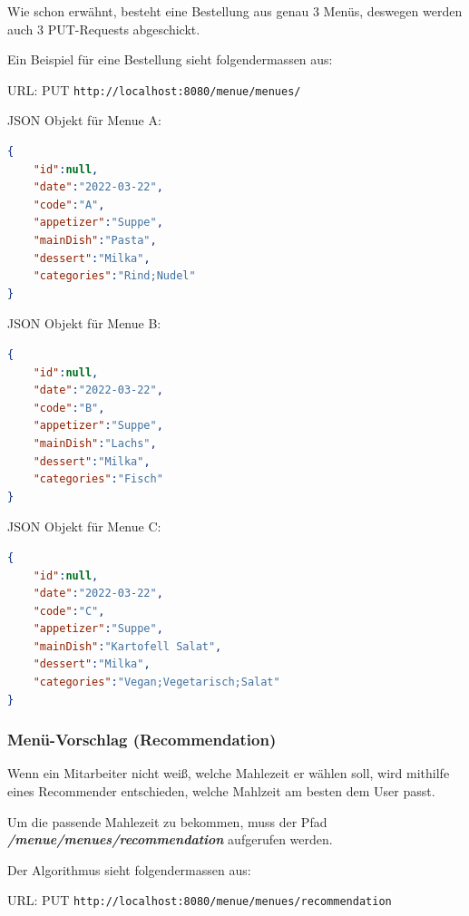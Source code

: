 Wie schon erwähnt, besteht eine Bestellung aus genau 3 Menüs, deswegen werden auch 3 PUT-Requests abgeschickt.

Ein Beispiel für eine Bestellung sieht folgendermassen aus:

URL: PUT \colorbox{white}{\lstinline[basicstyle=\ttfamily\color{black},language=html]|http://localhost:8080/menue/menues/|}

JSON Objekt für Menue A:

\begin{lstlisting}[language=json,firstnumber=1]
{
    "id":null,
    "date":"2022-03-22",
    "code":"A",
    "appetizer":"Suppe",
    "mainDish":"Pasta",
    "dessert":"Milka",
    "categories":"Rind;Nudel"
}
\end{lstlisting}

JSON Objekt für Menue B:

\begin{lstlisting}[language=json,firstnumber=1]
{
    "id":null,
    "date":"2022-03-22",
    "code":"B",
    "appetizer":"Suppe",
    "mainDish":"Lachs",
    "dessert":"Milka",
    "categories":"Fisch"
}
\end{lstlisting}

JSON Objekt für Menue C:

\begin{lstlisting}[language=json,firstnumber=1]
{
    "id":null,
    "date":"2022-03-22",
    "code":"C",
    "appetizer":"Suppe",
    "mainDish":"Kartofell Salat",
    "dessert":"Milka",
    "categories":"Vegan;Vegetarisch;Salat"
}
\end{lstlisting}

\subsubsection{Menü-Vorschlag (Recommendation)}

Wenn ein Mitarbeiter nicht weiß, welche Mahlezeit er wählen soll, wird mithilfe eines Recommender entschieden, welche Mahlzeit am besten dem 
User passt.  

Um die passende Mahlezeit zu bekommen, muss der Pfad \textbf{\textit{/menue/menues/recommendation}} aufgerufen werden.

Der Algorithmus sieht folgendermassen aus:

URL: PUT \colorbox{white}{\lstinline[basicstyle=\ttfamily\color{black},language=html]|http://localhost:8080/menue/menues/recommendation|}

